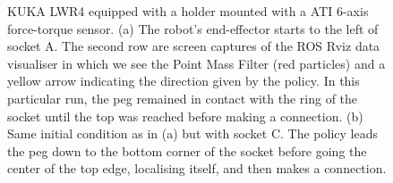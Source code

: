 \begin{figure}
 \centering
 \caption{KUKA LWR4 equipped with a holder mounted with a ATI 6-axis force-torque sensor. (a) The robot's end-effector starts to the 
 left of socket A. The second row are screen captures of the ROS Rviz data visualiser in which we see the Point Mass Filter 
 (red particles) and a yellow arrow indicating the direction given by the policy. In this particular run, the peg remained in contact with the ring of the socket until 
 the top was reached before making a connection. (b) Same initial condition as in (a) but with socket C. The policy leads the peg down to 
 the bottom corner of the socket before going the center of the top edge, localising itself, and then makes a connection.}
 \label{fig:real_pictures}
\end{figure}

